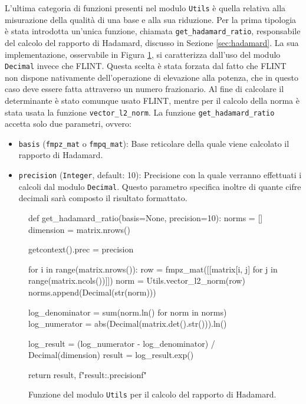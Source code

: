 L'ultima categoria di funzioni presenti nel modulo \texttt{Utils} è quella relativa alla
misurazione della qualità di una base e alla sua riduzione. Per la prima tipologia è 
stata introdotta un'unica funzione, chiamata \texttt{get\_hadamard\_ratio},
responsabile del calcolo del rapporto di Hadamard, discusso
in Sezione \ref{sec:hadamard}. La sua implementazione, osservabile in Figura 
\ref{fig:utilshadamard}, si caratterizza dall'uso del modulo \texttt{Decimal} invece che
FLINT. Questa scelta è stata forzata dal fatto che FLINT non dispone nativamente dell'operazione
di elevazione alla potenza, che in questo caso deve essere fatta attraverso un numero frazionario.
Al fine di calcolare il determinante è stato comunque usato FLINT, mentre per il calcolo 
della norma è stata usata la funzione \texttt{vector\_l2\_norm}. 
La funzione \texttt{get\_hadamard\_ratio} accetta solo due parametri, ovvero:
\begin{itemize}
    \item \texttt{basis} (\texttt{fmpz\_mat} o \texttt{fmpq\_mat}): Base reticolare della
    quale viene calcolato il rapporto di Hadamard.
    \item \texttt{precision} (\texttt{Integer}, default: 10): Precisione con la quale 
    verranno effettuati i calcoli dal modulo \texttt{Decimal}. Questo parametro specifica
    inoltre di quante cifre decimali sarà composto il risultato formattato. 
\end{itemize}

\begin{figure}[H]
    \begin{python}
        def get_hadamard_ratio(basis=None, precision=10):
            norms = []
            dimension = matrix.nrows()
            
            getcontext().prec = precision
            
            for i in range(matrix.nrows()):
                row = fmpz_mat([[matrix[i, j] 
                                for j in range(matrix.ncols())]])
                norm = Utils.vector_l2_norm(row)
                norms.append(Decimal(str(norm)))
            
            log_denominator = sum(norm.ln() for norm in norms)
            log_numerator = abs(Decimal(matrix.det().str())).ln()
            
            log_result = (log_numerator - log_denominator) /
                                                Decimal(dimension)
            result = log_result.exp()
            
            return result, f"{result:.{precision}f}"
    \end{python}
    \caption{Funzione del modulo \texttt{Utils} per il calcolo del rapporto di Hadamard.}
    \label{fig:utilshadamard}
\end{figure}

